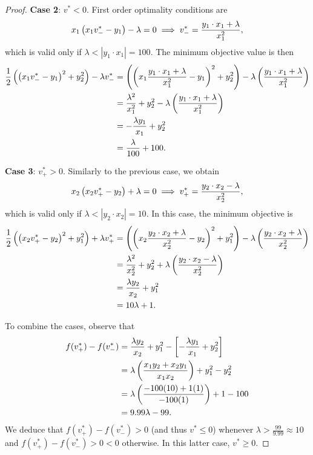 \begin{proof}
    \textbf{Case 2}: \( v^* < 0 \).
    First order optimality conditions are
    \[
        x_1 \left(x_1 v_{-}^* - y_1\right) - \lambda = 0 \implies v_{-}^* = \frac{y_1 \cdot x_1 + \lambda}{x_1^2},
    \]
    which is valid only if \( \lambda < |y_1 \cdot x_1| = 100 \).
    The minimum objective value is then
    \begin{align*}
        \frac 1 2 \left(\left(x_1 v_{-}^* - y_1\right)^2 + y_2^2\right) - \lambda v_{-}^*
         & = \left(\left(x_1 \frac{y_1 \cdot x_1 + \lambda}{x_1^2} - y_1\right)^2 + y_2^2\right) - \lambda \left(\frac{y_1 \cdot x_1 + \lambda}{x_1^2}\right) \\
         & = \frac{\lambda^2}{x_1^2} + y_2^2 - \lambda \left(\frac{y_1 \cdot x_1 + \lambda}{x_1^2}\right)                                       \\
         & = -\frac{\lambda y_1}{x_1} + y_2^2                                                                                            \\
         & = \frac{\lambda}{100} + 100.
    \end{align*}

    \textbf{Case 3}: \( v_{+}^* > 0 \).
    Similarly to the previous case, we obtain
    \[
        x_2 \left(x_2 v_{+}^* - y_2\right) + \lambda = 0 \implies v_{+}^* = \frac{y_2 \cdot x_2 - \lambda}{x_2^2},
    \]
    which is valid only if \( \lambda < |y_2 \cdot x_2| = 10 \).
    In this case, the minimum objective is
    \begin{align*}
        \frac 1 2 \left(\left(x_2 v_{+}^* - y_2\right)^2 + y_1^2\right) + \lambda v_{+}^*
         & = \left(\left(x_2 \frac{y_2 \cdot x_2 + \lambda}{x_2^2} - y_2\right)^2 + y_1^2\right) - \lambda \left(\frac{y_2 \cdot x_2 + \lambda}{x_2^2}\right) \\
         & = \frac{\lambda^2}{x_2^2} + y_2^2 + \lambda \left(\frac{y_2 \cdot x_2 - \lambda}{x_2^2}\right)                                       \\
         & = \frac{\lambda y_2}{x_2} + y_1^2                                                                                             \\
         & = 10 \lambda + 1.
    \end{align*}

    To combine the cases, observe that
    \begin{align*}
        f(v_+^*) - f(v_-^*)
         & = \frac{\lambda y_2}{x_2} + y_1^2 - \left[-\frac{\lambda y_1}{x_1} + y_2^2\right] \\
         & = \lambda \left(\frac{x_1 y_2 + x_2 y_1}{x_1 x_2}\right) + y_1^2 - y_2^2          \\
         & = \lambda \left(\frac{-100 (10) + 1 (1)}{-100 (1)}\right) + 1 - 100               \\
         & = 9.99 \lambda - 99.
    \end{align*}
    We deduce that \( f(v_+^*) - f(v_-^*) > 0 \) (and thus \( v^* \leq 0 \))
    whenever \( \lambda > \frac{99}{9.99} \approx 10 \) and
    \( f(v_+^*) - f(v_-^*) > 0 < 0 \) otherwise.
    In this latter case, \( v^* \geq 0 \).


\end{proof}
